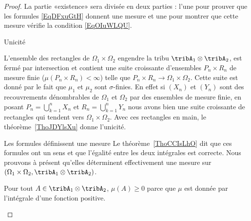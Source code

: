 \begin{proof}
    La partie «existence» sera divisée en deux parties : l'une pour prouver que les formules \eqref{EqDFxuGtH} donnent une mesure et une pour montrer que cette mesure vérifie la condition \eqref{EqOIuWLQU}.
    \begin{subproof}
    \item[Unicité]

    L'ensemble des rectangles de \( \Omega_1\times \Omega_2\) engendre la tribu \( \tribA_1\otimes\tribA_2\), est fermé par intersection et contient une suite croissante d'ensembles \( P_n\times R_n\) de mesure finie (\( \mu(P_n\times R_n)<\infty\)) telle que \( P_n\times R_n\to \Omega_1\times \Omega_2\). Cette suite est donné par le fait que \( \mu_1\) et \( \mu_2\) sont \( \sigma\)-finies. En effet si \( (X_n)\) et \( (Y_n)\) sont des recouvrements dénombrables de \( \Omega_1\) et \( \Omega_2\) par des ensembles de mesure finie, en posant \( P_n=\bigcup_{k=1}^nX_n\) et \( R_n=\bigcup_{k=1}^nY_n\) nous avons bien une suite croissante de rectangles qui tendent vers \( \Omega_1\times \Omega_2\). Avec ces rectangles en main, le théorème~\ref{ThoJDYlsXu} donne l'unicité.

\item[Les formules définissent une mesure]
    Le théorème~\ref{ThoCCIsLhO} dit que ces formules ont un sens et que l'égalité entre les deux intégrales est correcte. Nous prouvons à présent qu'elles déterminent effectivement une mesure sur \( (\Omega_1\times\Omega_2,\tribA_1\otimes \tribA_2)\).

    Pour tout \( A\in \tribA_1\otimes \tribA_2\), \( \mu(A)\geq 0\) parce que \( \mu\) est donnée par l'intégrale d'une fonction positive.


\end{subproof}
\end{proof}
